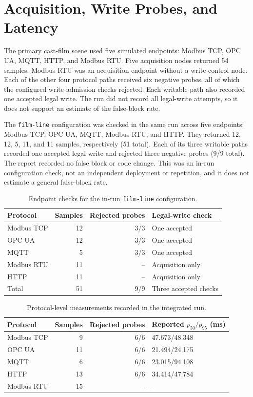 \documentclass[journal]{IEEEtran}
\begin{document}
\section{Acquisition, Write Probes, and Latency}
The primary cast-film scene used five simulated endpoints: Modbus TCP,
OPC UA, MQTT, HTTP, and Modbus RTU. Five acquisition nodes returned 54 samples.
Modbus RTU was an acquisition
endpoint without a write-control node. Each of the other four protocol paths
received six negative probes, all of which the configured write-admission
checks rejected. Each writable path also recorded one accepted legal write.
The run did not record all legal-write attempts, so it does not support an
estimate of the false-block rate.

The \texttt{film-line} configuration was checked in the same run across five
endpoints: Modbus TCP, OPC UA, MQTT, Modbus RTU, and HTTP. They returned 12,
12, 5, 11, and 11 samples, respectively (51 total). Each of its three
writable paths recorded one accepted legal write and rejected three negative
probes (9/9 total). The report recorded no false block or code change. This
was an in-run configuration check, not an independent deployment or
repetition, and it does not estimate a general false-block rate.

\begin{table}[!t]
\centering
\caption{Endpoint checks for the in-run \texttt{film-line} configuration.}
\label{tab:s6-second-scene}
\footnotesize
\setlength{\tabcolsep}{3pt}
\begin{tabularx}{\columnwidth}{@{}>{\raggedright\arraybackslash}p{1.45cm}r r X@{}}
\toprule
Protocol & Samples & Rejected probes & Legal-write check\\
\midrule
Modbus TCP & 12 & 3/3 & One accepted\\
OPC UA & 12 & 3/3 & One accepted\\
MQTT & 5 & 3/3 & One accepted\\
Modbus RTU & 11 & -- & Acquisition only\\
HTTP & 11 & -- & Acquisition only\\
\midrule
Total & 51 & 9/9 & Three accepted checks\\
\bottomrule
\end{tabularx}
\end{table}

\begin{table}[!t]
\centering
\caption{Protocol-level measurements recorded in the integrated run.}
\label{tab:s6-protocol}
\footnotesize
\setlength{\tabcolsep}{3pt}
\begin{tabularx}{\columnwidth}{@{}>{\raggedright\arraybackslash}p{1.35cm}r r X@{}}
\toprule
Protocol & Samples & Rejected probes & Reported $p_{50}/p_{95}$ (ms)\\
\midrule
Modbus TCP & 9 & 6/6 & 47.673/48.348\\
OPC UA & 11 & 6/6 & 21.494/24.175\\
MQTT & 6 & 6/6 & 23.015/94.108\\
HTTP & 13 & 6/6 & 34.414/47.784\\
Modbus RTU & 15 & -- & --\\
\bottomrule
\end{tabularx}
\end{table}
\end{document}
